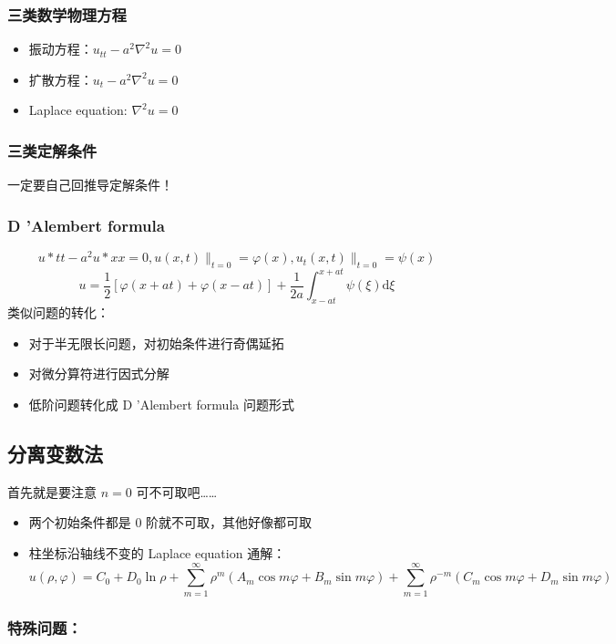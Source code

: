 \documentclass{article}
\begin{document}
\subsubsection{三类数学物理方程}

\begin{itemize}
    \item 振动方程：$u_{tt}-a^2\nabla^2u=0$
    \item 扩散方程：$u_{t}-a^2\nabla^2u=0$
    \item Laplace equation: $\nabla^2u=0$
\end{itemize}

\subsubsection{三类定解条件}

一定要自己回推导定解条件！

\subsubsection{D 'Alembert formula}

$$ u*{tt}-a^2u*{xx}=0, u(x, t)\|_{t=0}=\varphi(x), u_t(x, t)\|_{t=0}=\psi(x) $$
$$ u=\frac{1}{2}[\varphi(x+at)+\varphi(x-at)]+\frac{1}{2a}\int^{x+at}_{x-at}\psi(\xi)\mathrm{d}\xi $$
类似问题的转化：
\begin{itemize}
    \item 对于半无限长问题，对初始条件进行奇偶延拓
    \item 对微分算符进行因式分解
    \item 低阶问题转化成 D 'Alembert formula 问题形式
\end{itemize}

\subsection{分离变数法}

首先就是要注意 $n=0$ 可不可取吧……
\begin{itemize}
    \item 两个初始条件都是 0 阶就不可取，其他好像都可取
    \item 柱坐标沿轴线不变的 Laplace equation 通解：$$u(\rho, \varphi)=C_0+D_0\ln\rho+\sum^\infty_{m=1}\rho^m(A_m\cos m\varphi+B_m\sin m\varphi)+\sum^\infty_{m=1}\rho^{-m}(C_m\cos m\varphi+D_m\sin m\varphi)$$
\end{itemize}

\subsubsection{特殊问题：}
\end{document}
